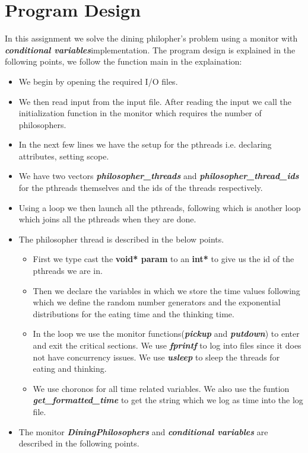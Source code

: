 \documentclass[a4paper,12pt]{report}
\begin{document}
\section{Program Design}
In this assignment we solve the dining philopher's problem using a monitor with \textbf{\textit{conditional variables}}implementation. The program design is explained in the following points, we follow the function main in the explaination:
\begin{itemize}
\item We begin by opening the required I/O files.
\item We then read input from the input file. After reading the input we call the initialization function in the monitor which requires the number of philosophers.
\item In the next few lines we have the setup for the pthreads i.e. declaring attributes, setting scope.
\item We have two vectors \textbf{\textit{philosopher\_threads}} and \textbf{\textit{philosopher\_thread\_ids}} for the pthreads themselves and the ids of the threads respectively.
\item Using a loop we then launch all the pthreads, following which is another loop which joins all the pthreads when they are done.
\item The philosopher thread is described in the below points.
\begin{itemize}
\item First we type cast the \textbf{void* param} to an \textbf{int*} to give us the id of the pthreads we are in.
\item Then we declare the variables in which we store the time values following which we define the random number generators and the exponential distributions for the eating time and the thinking time.
\item In the loop we use the monitor functions(\textit{\textbf{pickup}} and \textit{\textbf{putdown}}) to enter and exit the critical sections. We use \textit{\textbf{fprintf}} to log into files since it does not have concurrency issues. We use \textit{\textbf{usleep}} to sleep the threads for eating and thinking.
\item We use choronos for all time related variables. We also use the funtion \textbf{\textit{get\_formatted\_time}} to get the string which we log as time into the log file.
\end{itemize}
\item The monitor \textit{\textbf{DiningPhilosophers}} and \textbf{\textit{conditional variables}} are described in the following points.

\end{itemize}
\end{document}
